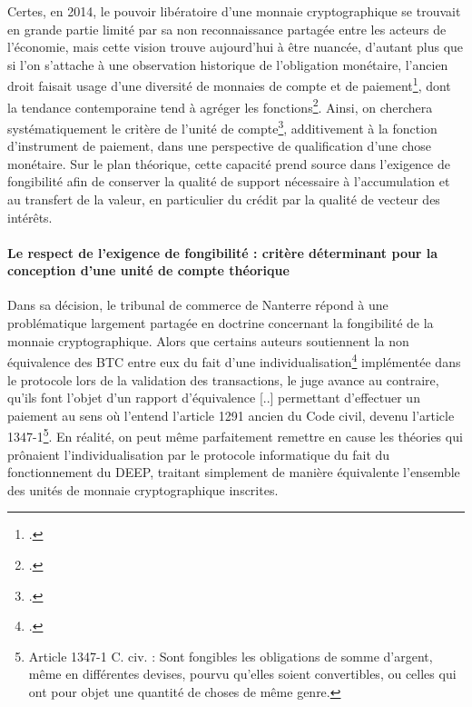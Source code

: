 { Certes, en 2014, le pouvoir libératoire d'une monnaie cryptographique se trouvait en grande partie limité par sa non reconnaissance partagée entre les acteurs de l'économie, mais cette vision trouve aujourd'hui à être nuancée, d'autant plus que si l'on s'attache à une observation historique de l'obligation monétaire, l'ancien droit faisait usage d'une diversité de monnaies de compte et de paiement\footnote{.}, dont la tendance contemporaine tend à agréger les fonctions\footnote{.}. Ainsi, on cherchera systématiquement le critère de l'unité de compte\footnote{.}, additivement à la fonction d'instrument de paiement, dans une perspective de qualification d'une chose monétaire. Sur le plan théorique, cette capacité prend source dans l'exigence de fongibilité afin de conserver la qualité de support nécessaire à l'accumulation et au transfert de la valeur, en particulier du crédit par la qualité de vecteur des intérêts.\par 

\paragraph{Le respect de l'exigence de fongibilité : critère déterminant pour la conception d'une unité de compte théorique}

Dans sa décision, le tribunal de commerce de Nanterre répond à une problématique largement partagée en doctrine concernant la fongibilité de la monnaie cryptographique. Alors que certains auteurs soutiennent la non équivalence des BTC entre eux du fait d'une individualisation\footnote{.} implémentée dans le protocole lors de la validation des transactions, le juge avance au contraire, qu'ils font \og l'objet d'un rapport d'équivalence [..] permettant d'effectuer un paiement au sens où l'entend l'article 1291 ancien du Code civil, devenu l'article 1347-1\footnote{Article 1347-1 C. civ. : \og Sont fongibles les obligations de somme d'argent, même en différentes devises, pourvu qu'elles soient convertibles, ou celles qui ont pour objet une quantité de choses de même genre\fg{}.}\fg{}. En réalité, on peut même parfaitement remettre en cause les théories qui prônaient l'individualisation par le protocole informatique du fait du fonctionnement du DEEP, traitant simplement de manière équivalente l'ensemble des unités de monnaie cryptographique inscrites.\par

}

